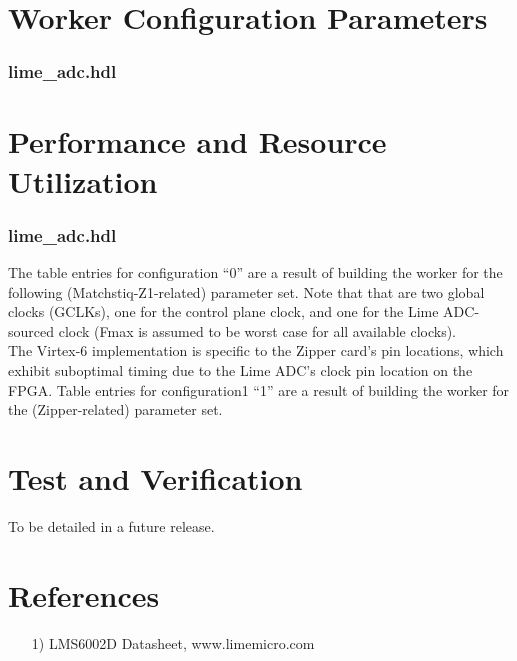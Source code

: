 \documentclass{article}
\def\comp{lime\_adc}
\edef\ecomp{lime_adc}
\begin{document}
\begin{landscape}
\section*{Worker Configuration Parameters}
\subsubsection*{\comp.hdl}

\section*{Performance and Resource Utilization}
\subsubsection*{\comp.hdl}
The table entries for configuration ``0'' are a result of building the worker for the following (Matchstiq-Z1-related) parameter set. Note that that are two global clocks (GCLKs), one for the control plane clock, and one for the Lime ADC-sourced clock (Fmax is assumed to be worst case for all available clocks).\\

The Virtex-6 implementation is specific to the Zipper card's pin locations, which exhibit suboptimal timing due to the Lime ADC's clock pin location on the FPGA. Table entries for configuration1 ``1'' are a result of building the worker for the (Zipper-related) parameter set.\\


\end{landscape}
\section*{Test and Verification}
\begin{flushleft}
 To be detailed in a future release.
\end{flushleft}
\section*{References}
\begin{flushleft}
	\begin{itemize}
		\item[1)] LMS6002D Datasheet, www.limemicro.com
	\end{itemize}
\end{flushleft}
\end{document}

